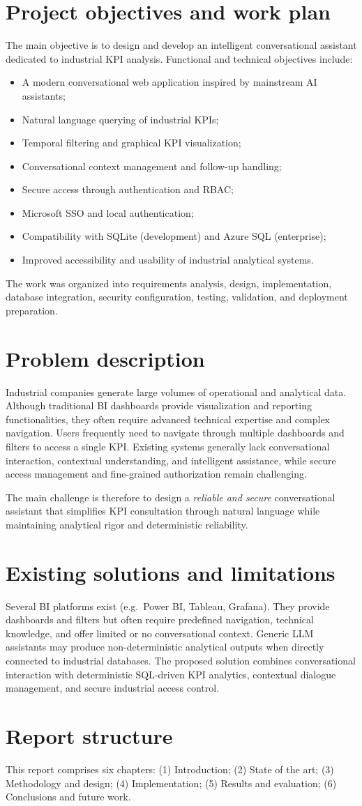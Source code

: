 \section{Project objectives and work plan}
The main objective is to design and develop an intelligent conversational assistant dedicated to industrial KPI analysis. Functional and technical objectives include:
\begin{itemize}[leftmargin=*]
  \item A modern conversational web application inspired by mainstream AI assistants;
  \item Natural language querying of industrial KPIs;
  \item Temporal filtering and graphical KPI visualization;
  \item Conversational context management and follow-up handling;
  \item Secure access through authentication and RBAC;
  \item Microsoft SSO and local authentication;
  \item Compatibility with SQLite (development) and Azure SQL (enterprise);
  \item Improved accessibility and usability of industrial analytical systems.
\end{itemize}
The work was organized into requirements analysis, design, implementation, database integration, security configuration, testing, validation, and deployment preparation.

\section{Problem description}
Industrial companies generate large volumes of operational and analytical data. Although traditional BI dashboards provide visualization and reporting functionalities, they often require advanced technical expertise and complex navigation. Users frequently need to navigate through multiple dashboards and filters to access a single KPI. Existing systems generally lack conversational interaction, contextual understanding, and intelligent assistance, while secure access management and fine-grained authorization remain challenging.

The main challenge is therefore to design a \emph{reliable and secure} conversational assistant that simplifies KPI consultation through natural language while maintaining analytical rigor and deterministic reliability.

\section{Existing solutions and limitations}
Several BI platforms exist (e.g.\ Power BI, Tableau, Grafana). They provide dashboards and filters but often require predefined navigation, technical knowledge, and offer limited or no conversational context. Generic LLM assistants may produce non-deterministic analytical outputs when directly connected to industrial databases. The proposed solution combines conversational interaction with deterministic SQL-driven KPI analytics, contextual dialogue management, and secure industrial access control.

\section{Report structure}
This report comprises six chapters: (1) Introduction; (2) State of the art; (3) Methodology and design; (4) Implementation; (5) Results and evaluation; (6) Conclusions and future work.
